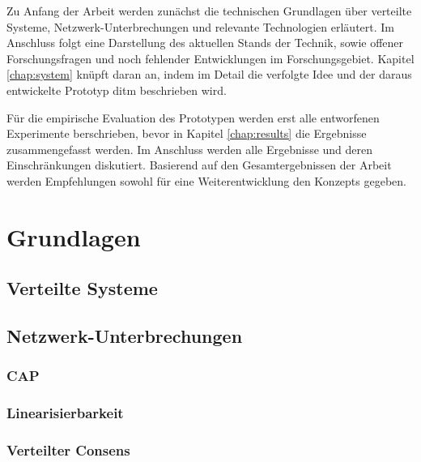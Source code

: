 \documentclass[12pt,a4paper]{report}
\begin{document}
Zu Anfang der Arbeit werden zunächst die technischen Grundlagen über verteilte Systeme, Netzwerk-Unterbrechungen und relevante
Technologien erläutert. Im Anschluss folgt eine Darstellung des aktuellen Stands der Technik, sowie offener Forschungsfragen und
noch fehlender Entwicklungen im Forschungsgebiet. Kapitel \ref{chap:system} knüpft daran an, indem im Detail die verfolgte Idee
und der daraus entwickelte Prototyp ditm beschrieben wird.

Für die empirische Evaluation des Prototypen werden erst alle entworfenen Experimente berschrieben, bevor in Kapitel
\ref{chap:results} die Ergebnisse zusammengefasst werden. Im Anschluss werden alle Ergebnisse und deren Einschränkungen
diskutiert. Basierend auf den Gesamtergebnissen der Arbeit werden Empfehlungen sowohl für eine Weiterentwicklung den Konzepts
gegeben.

\chapter{Grundlagen}

\section{Verteilte Systeme}


\section{Netzwerk-Unterbrechungen}
\subsection{CAP}
\subsection{Linearisierbarkeit}
\subsection{Verteilter Consens}
\end{document}
